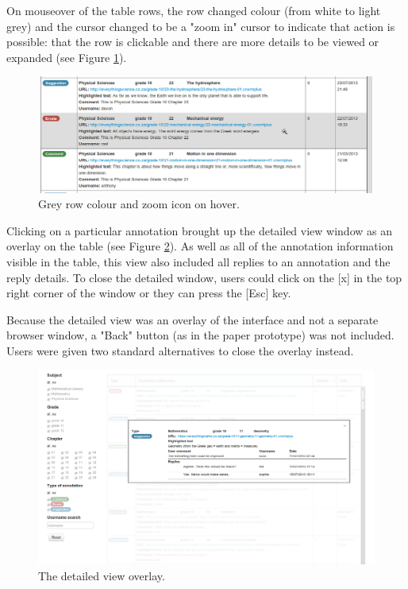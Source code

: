 On mouseover of the table rows, the row changed colour (from white to light grey) and the cursor changed to be a "zoom in" cursor to indicate that action is possible: that the row is clickable and there are more details to be viewed or expanded (see Figure \ref{fig:mouseover}).

\begin{figure}[h!]
    \centering
    \includegraphics[width=\textwidth]{Figures/V1/mouseover.png}
 \caption{Grey row colour and zoom icon on hover.}
 \label{fig:mouseover}

\end{figure}

Clicking on a particular annotation brought up the detailed view window as an overlay on the table (see Figure \ref{fig:detailedview}). As well as all of the annotation information visible in the table, this view also included all replies to an annotation and the reply details. To close the detailed window, users could click on the [x] in the top right corner of the window or they can press the [Esc] key. 

Because the detailed view was an overlay of the interface and not a separate browser window, a "Back" button (as in the paper prototype) was not included. Users were given two standard alternatives to close the overlay instead. 

\begin{figure}[h!]
    \centering
    \includegraphics[width=\textwidth]{Figures/V1/detailedview.png}
 \caption{The detailed view overlay.}
 \label{fig:detailedview}

\end{figure}

